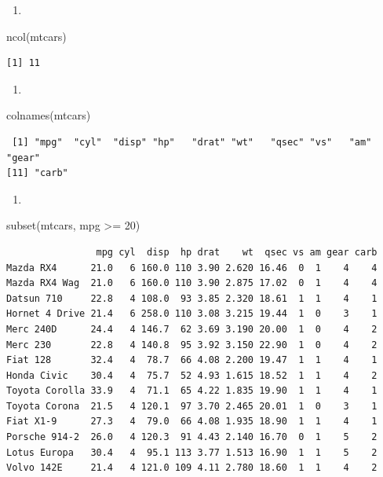 \documentclass[
  letterpaper,
  DIV=11,
  numbers=noendperiod]{scrreprt}
\newenvironment{Shaded}{\begin{snugshade}}{\end{snugshade}}
\newcommand{\DecValTok}[1]{\textcolor[rgb]{0.68,0.00,0.00}{#1}}
\newcommand{\FunctionTok}[1]{\textcolor[rgb]{0.28,0.35,0.67}{#1}}
\newcommand{\NormalTok}[1]{\textcolor[rgb]{0.00,0.23,0.31}{#1}}
\newcommand{\SpecialCharTok}[1]{\textcolor[rgb]{0.37,0.37,0.37}{#1}}
\providecommand{\tightlist}{%
  \setlength{\itemsep}{0pt}\setlength{\parskip}{0pt}}\usepackage{longtable,booktabs,array}
\begin{document}
\begin{enumerate}
\def\labelenumi{\alph{enumi})}
\setcounter{enumi}{1}
\tightlist
\item
\end{enumerate}

\begin{Shaded}
\begin{Highlighting}[]
\FunctionTok{ncol}\NormalTok{(mtcars)}
\end{Highlighting}
\end{Shaded}

\begin{verbatim}
[1] 11
\end{verbatim}

\begin{enumerate}
\def\labelenumi{\alph{enumi})}
\setcounter{enumi}{2}
\tightlist
\item
\end{enumerate}

\begin{Shaded}
\begin{Highlighting}[]
\FunctionTok{colnames}\NormalTok{(mtcars)}
\end{Highlighting}
\end{Shaded}

\begin{verbatim}
 [1] "mpg"  "cyl"  "disp" "hp"   "drat" "wt"   "qsec" "vs"   "am"   "gear"
[11] "carb"
\end{verbatim}

\begin{enumerate}
\def\labelenumi{\alph{enumi})}
\setcounter{enumi}{3}
\tightlist
\item
\end{enumerate}

\begin{Shaded}
\begin{Highlighting}[]
\FunctionTok{subset}\NormalTok{(mtcars, mpg }\SpecialCharTok{\textgreater{}=} \DecValTok{20}\NormalTok{)}
\end{Highlighting}
\end{Shaded}

\begin{verbatim}
                mpg cyl  disp  hp drat    wt  qsec vs am gear carb
Mazda RX4      21.0   6 160.0 110 3.90 2.620 16.46  0  1    4    4
Mazda RX4 Wag  21.0   6 160.0 110 3.90 2.875 17.02  0  1    4    4
Datsun 710     22.8   4 108.0  93 3.85 2.320 18.61  1  1    4    1
Hornet 4 Drive 21.4   6 258.0 110 3.08 3.215 19.44  1  0    3    1
Merc 240D      24.4   4 146.7  62 3.69 3.190 20.00  1  0    4    2
Merc 230       22.8   4 140.8  95 3.92 3.150 22.90  1  0    4    2
Fiat 128       32.4   4  78.7  66 4.08 2.200 19.47  1  1    4    1
Honda Civic    30.4   4  75.7  52 4.93 1.615 18.52  1  1    4    2
Toyota Corolla 33.9   4  71.1  65 4.22 1.835 19.90  1  1    4    1
Toyota Corona  21.5   4 120.1  97 3.70 2.465 20.01  1  0    3    1
Fiat X1-9      27.3   4  79.0  66 4.08 1.935 18.90  1  1    4    1
Porsche 914-2  26.0   4 120.3  91 4.43 2.140 16.70  0  1    5    2
Lotus Europa   30.4   4  95.1 113 3.77 1.513 16.90  1  1    5    2
Volvo 142E     21.4   4 121.0 109 4.11 2.780 18.60  1  1    4    2
\end{verbatim}
\end{document}
